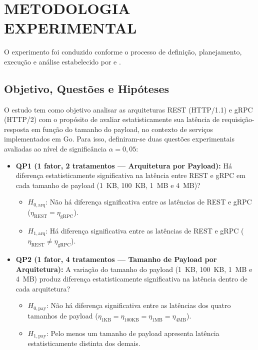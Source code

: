 \documentclass[a4paper, 12pt]{article}
\begin{document}
\section{METODOLOGIA EXPERIMENTAL}

O experimento foi conduzido conforme o processo de definição, planejamento, execução e análise estabelecido por  e .

\subsection{Objetivo, Questões e Hipóteses}

O estudo tem como objetivo analisar as arquiteturas REST (HTTP/1.1) e gRPC (HTTP/2) com o propósito de avaliar estatisticamente sua latência de requisição-resposta em função do tamanho do payload, no contexto de serviços implementados em Go. Para isso, definiram-se duas questões experimentais avaliadas ao nível de significância $\alpha = 0{,}05$:

\begin{itemize}[noitemsep, topsep=4pt]
  \item \textbf{QP1 (1 fator, 2 tratamentos — Arquitetura por Payload):} Há diferença estatisticamente significativa na latência entre REST e gRPC em cada tamanho de payload (1~KB, 100~KB, 1~MB e 4~MB)?
  \begin{itemize}[noitemsep]
    \item $H_{0,\text{arq}}$: Não há diferença significativa entre as latências de REST e gRPC ($\eta_{\text{REST}} = \eta_{\text{gRPC}}$).
    \item $H_{1,\text{arq}}$: Há diferença significativa entre as latências de REST e gRPC ($\eta_{\text{REST}} \neq \eta_{\text{gRPC}}$).
  \end{itemize}
  \item \textbf{QP2 (1 fator, 4 tratamentos — Tamanho de Payload por Arquitetura):} A variação do tamanho do payload (1~KB, 100~KB, 1~MB e 4~MB) produz diferença estatisticamente significativa na latência dentro de cada arquitetura?
  \begin{itemize}[noitemsep]
    \item $H_{0,\text{pay}}$: Não há diferença significativa entre as latências dos quatro tamanhos de payload ($\eta_{\text{1KB}} = \eta_{\text{100KB}} = \eta_{\text{1MB}} = \eta_{\text{4MB}}$).
    \item $H_{1,\text{pay}}$: Pelo menos um tamanho de payload apresenta latência estatisticamente distinta dos demais.
  \end{itemize}
\end{itemize}
\end{document}
